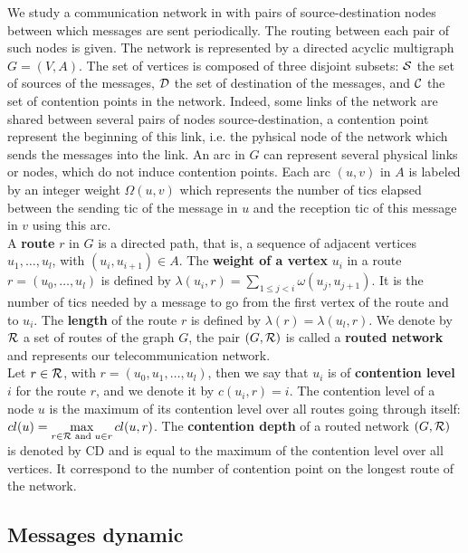 \documentclass[english]{article}
\begin{document}
  We study a communication network in with pairs of source-destination nodes between which messages are sent periodically. The routing between each  pair of such nodes is given. The network is represented by a directed acyclic multigraph $G=(V,A)$. The set of vertices is composed of three disjoint subsets:  ${\cal S}$ the set of sources of the messages, ${\cal D}$ the set of destination of the messages, and ${\cal C}$ the set of contention points in the network. Indeed, some links of the network are shared between several pairs of nodes source-destination, a contention point represent the beginning of this link, i.e. the pyhsical node of the network which sends the messages into the link. An arc in $G$ can represent several physical links or nodes, which do not induce contention points. Each arc  $(u,v)$ in $A$ is labeled by an integer weight $\Omega(u,v)$ which represents the number of tics elapsed between the sending tic of the message in $u$ and the reception tic of this message in $v$ using this arc. \\
  A {\bf route} $r$ in $G$ is a directed path, that is, a sequence of adjacent vertices $u_1, \ldots , u_{l}$, with $(u_i,u_{i+1}) \in A$.  The {\bf weight of a vertex} $u_i$ in a route $r=(u_0,\dots,u_l)$ is defined by $\lambda(u_i,r)= \sum\limits_{1 \leq j <i} \omega(u_j, u_{j+1})$. It is the number of tics needed by a message to go from the first vertex of the route and to $u_i$. The \textbf{length} of the route $r$ is defined by $\lambda (r)= \lambda (u_l,r)$.
	We denote by ${\cal R}$ a set of routes of the graph $G$, the pair $(G,{\cal R})$ is called a \textbf{routed network} and represents our telecommunication network.\\
	Let $r \in {\cal R}$, with $r = (u_0,u_1,\dots,u_l)$, then we say that $u_i$ is of \textbf{contention level} $i$ for the route $r$, and we denote it by $c(u_i,r) = i$. The contention level of a node $u$ is the maximum of its contention level over all routes going through itself: 
	$cl(u) = \max\limits_{r\in{\cal R} \text{ and } u \in r} cl(u,r)$.
	The  \textbf{contention depth} of a routed network $(G,{\cal R})$ is denoted by \textsc{CD} and is equal to the maximum of the contention level over all vertices. It correspond to the number of contention point on the longest route of the network. 


 \subsection{Messages dynamic}
	     
\end{document}
